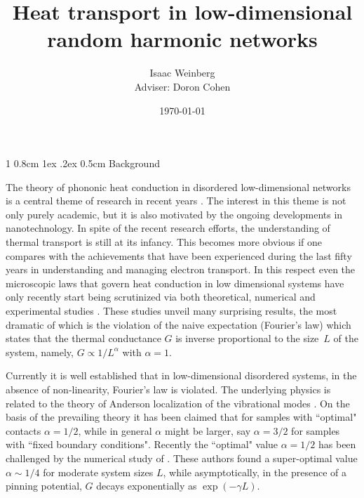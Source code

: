 \documentclass[onecolumn,fleqn,notitlepage,secnumarabic]{revtex4}
\makeatletter
\def\section{%
  \@startsection
    {section}%
    {1}%
    {\z@}%
    {0.8cm \@plus1ex \@minus .2ex}%
    {0.5cm}%
    {\Large\bf }%
}%
\makeatother
\begin{document}
  

\title{Heat transport in low-dimensional random harmonic networks}


\author{ Isaac Weinberg\\Adviser: Doron Cohen }
\date{\today}
\maketitle

\section{Background}

The theory of phononic heat conduction in disordered low-dimensional networks is a central theme of research in recent years \cite{LLP03,
D08,LRWZHL12}. The interest in this theme is not only purely academic, but it is also motivated by the ongoing developments in nanotechnology.
In spite of the recent research efforts, the understanding of thermal transport is still at its infancy. This becomes more obvious if one compares 
with the achievements that have been experienced during the last fifty years in understanding and managing electron transport. In this respect 
even the microscopic laws that govern heat conduction in low dimensional systems have only recently start being scrutinized via both theoretical, 
numerical and experimental studies \cite{LLP03,D08,COGMZ08,NGPB09,LRWZHL12,ZL10,K1,K2}. These studies unveil many surprising results, the most 
dramatic of which is the violation of the naive expectation (Fourier's law) which states that the thermal conductance $G$ is inverse proportional 
to the size~$L$ of the system, namely, $G\propto 1/L^{\alpha}$ with ${\alpha=1}$. 

Currently it is well established that in low-dimensional disordered systems, in the absence of non-linearity, Fourier's law  is violated. The
underlying physics is related to the theory of Anderson localization of the vibrational modes \cite{D08,D01,LXXZL12,DL08,LD05,RD08,LZH01,
KCRDLS10a,KCRDLS10b}. On the basis of the prevailing theory \cite{D08,D01} it has been claimed that for samples with ``optimal" contacts ${\alpha=1/2}$, 
while in general $\alpha$ might be larger, say ${\alpha=3/2}$ for samples with ``fixed boundary conditions". Recently the ``optimal" value 
${\alpha=1/2}$ has been challenged by the numerical study of \cite{BZFK13}. These authors found a super-optimal value ${\alpha \sim 1/4}$ for 
moderate system sizes $L$, while asymptotically, in the presence of a pinning potential, $G$ decays exponentially as ${\exp(-\gamma L)}$. 
\end{document}
